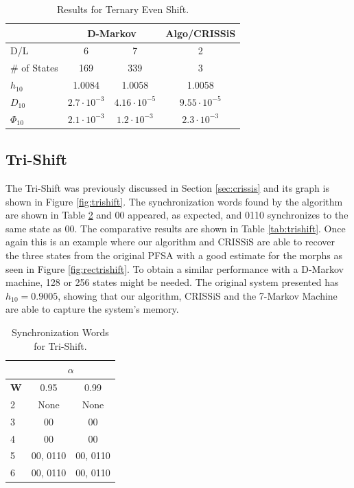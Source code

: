 {\begin{table}
\centering
\caption{Results for Ternary Even Shift. \label{tab:ternaryeven}}
\begin{tabular}{|l|c|c|c|}
\hline
 & \multicolumn{2}{c|}{\textbf{D-Markov}} & \textbf{Algo/CRISSiS}\\
 \hline
D/L & 6 & 7 & 2 \\
\hline
\# of States & 169 & 339 & 3 \\ 
$h_{10}$ & 1.0084 & 1.0058 & 1.0058 \\
$D_{10}$ & $2.7\cdot10^{-3}$ & $4.16\cdot10^{-5}$ & $9.55\cdot10^{-5}$ \\
$\Phi_{10}$  & $2.1\cdot10^{-3}$ & $1.2\cdot10^{-3}$ & $2.3\cdot10^{-3}$ \\
 \hline
\end{tabular}
\end{table}

\subsection{Tri-Shift}

The Tri-Shift was previously discussed in Section \ref{sec:crissis} and its graph is shown in Figure \ref{fig:trishift}. The synchronization words found by the algorithm are shown in Table \ref{tab:trishiftsynch} and 00 appeared, as expected, and 0110 synchronizes to the same state as 00. The comparative results are shown in Table \ref{tab:trishift}. Once again this is an example where our algorithm and CRISSiS are able to recover the three states from the original PFSA with a good estimate for the morphs as seen in Figure \ref{fig:rectrishift}. To obtain a similar performance with a D-Markov machine, 128 or 256 states might be needed. The original system presented has $h_{10} = 0.9005$, showing that our algorithm, CRISSiS and the 7-Markov Machine are able to capture the system's memory.

\begin{table}
\centering
\caption{Synchronization Words for Tri-Shift. \label{tab:trishiftsynch}}
\begin{tabular}{|l|c|c|}
\hline
 & \multicolumn{2}{c|}{\textbf{$\alpha$}}\\
 \hline
\textbf{W} & 0.95 & 0.99 \\
\hline
2 & None & None \\ 
3 & 00 & 00 \\ 
4 & 00 & 00 \\ 
5 & 00, 0110 & 00, 0110 \\
6 & 00, 0110 & 00, 0110 \\
 \hline
\end{tabular}
\end{table}


}
